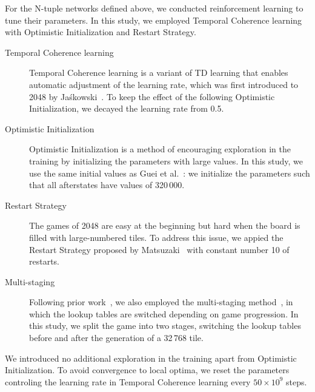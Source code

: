 
For the N-tuple networks defined above, we conducted reinforcement learning to tune their parameters.
In this study, we employed Temporal Coherence learning with Optimistic Initialization and Restart Strategy.
\begin{description}
 \item[Temporal Coherence learning] Temporal Coherence learning is a variant of TD learning that enables automatic adjustment of the learning rate, which was first introduced to 2048 by Ja\'skowski~\cite{Jask18}.  To keep the effect of the following Optimistic Initialization, we decayed the learning rate from 0.5.
 \item[Optimistic Initialization] Optimistic Initialization is a method of encouraging exploration in the training by initializing the parameters with large values.  In this study, we use the same initial values as Guei et al.~\cite{GuCW22}: we initialize the parameters such that all afterstates have values of 320\,000.
 \item[Restart Strategy] The games of 2048 are easy at the beginning but hard when the board is filled with large-numbered tiles.  To address this issue, we appied the Restart Strategy proposed by Matsuzaki~\cite{Mats17} with constant number 10 of restarts.
 \item[Multi-staging] Following prior work~\cite{GuCW22}, we also employed the multi-staging method~\cite{YWHC16}, in which the lookup tables are switched depending on game progression. In this study, we split the game into two stages, switching the lookup tables before and after the generation of a 32\,768 tile.
\end{description}
We introduced no additional exploration in the training apart from Optimistic Initialization.
To avoid convergence to local optima, we reset the parameters controling the learning rate in Temporal Coherence learning every $50 \times 10^9$ steps.

